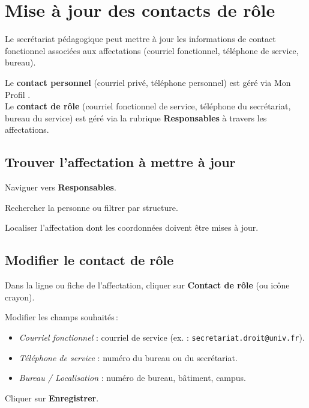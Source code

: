 
\section{Mise \`a jour des contacts de r\^ole}

Le secr\'etariat p\'edagogique peut mettre \`a jour les informations de contact fonctionnel associ\'ees aux affectations (courriel fonctionnel, t\'el\'ephone de service, bureau).

\begin{warnbox}
  Le \textbf{contact personnel} (courriel priv\'e, t\'el\'ephone personnel) est g\'er\'e via \og Mon Profil \fg{}. \\
  Le \textbf{contact de r\^ole} (courriel fonctionnel de service, t\'el\'ephone du secr\'etariat, bureau du service) est g\'er\'e via la rubrique \textbf{Responsables} \`a travers les affectations.
\end{warnbox}

\subsection{Trouver l'affectation \`a mettre \`a jour}

\begin{steps}
  \item Naviguer vers \textbf{Responsables}.
  \item Rechercher la personne ou filtrer par structure.
  \item Localiser l'affectation dont les coordonn\'ees doivent \^etre mises \`a jour.
\end{steps}

\subsection{Modifier le contact de r\^ole}

\begin{steps}
  \item Dans la ligne ou fiche de l'affectation, cliquer sur \textbf{Contact de r\^ole} (ou ic\^one crayon).
  \item Modifier les champs souhait\'es\,:
    \begin{itemize}
      \item \textit{Courriel fonctionnel} : courriel de service (ex. : \texttt{secretariat.droit@univ.fr}).
      \item \textit{T\'el\'ephone de service} : num\'ero du bureau ou du secr\'etariat.
      \item \textit{Bureau / Localisation} : num\'ero de bureau, b\^atiment, campus.
    \end{itemize}
  \item Cliquer sur \textbf{Enregistrer}.
\end{steps}

